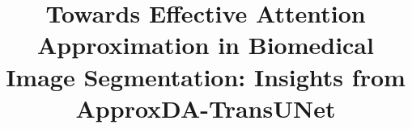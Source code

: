 \documentclass[journal]{IEEEtran}
\begin{document}
\title{Towards Effective Attention Approximation in Biomedical Image Segmentation: Insights from ApproxDA-TransUNet}

\author{
}

\maketitle












\end{document}
